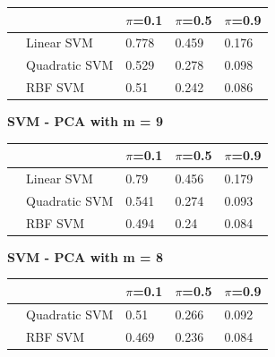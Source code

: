 \documentclass[english]{report}
\begin{document}
\begin{table}[H]
    \centering
    \begin{tabular}{lllll}
        \hline
                                & & $\pi$=0.1 & $\pi$=0.5 & $\pi$=0.9 \\\hline
                                
                                & Linear SVM        & 0.778 & 0.459 & 0.176 \\
                                & Quadratic SVM     & 0.529 & 0.278 & 0.098 \\
                                & RBF SVM           & 0.51  & 0.242 & 0.086\\ 
        \hline
    \end{tabular}
    \label{tab:SVM_Raw_eval}
\end{table}

\textbf{SVM - PCA with m = 9}

\begin{table}[H]
    \centering
    \begin{tabular}{lllll}
        \hline
                                & & $\pi$=0.1 & $\pi$=0.5 & $\pi$=0.9 \\\hline
                                                        
                                & Linear SVM        & 0.79  & 0.456 & 0.179 \\
                                & Quadratic SVM     & 0.541 & 0.274 & 0.093 \\
                                & RBF SVM           & 0.494 & 0.24  & 0.084\\  
        \hline
    \end{tabular}
    \label{tab:SVM_PCA9_eval}
\end{table}

\textbf{SVM - PCA with m = 8}

\begin{table}[H]
    \centering
    \begin{tabular}{lllll}
        \hline
                                & & $\pi$=0.1 & $\pi$=0.5 & $\pi$=0.9 \\\hline
                                                        
                                & Quadratic SVM     & 0.51 & 0.266 & 0.092 \\
                                & RBF SVM           & 0.469  & 0.236 & 0.084\\    
        \hline
    \end{tabular}
    \label{tab:SVM_PCA8_eval}
\end{table}
\end{document}
